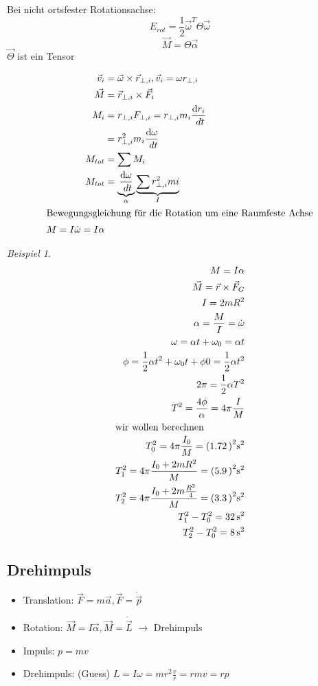 \documentclass[a4paper]{scrartcl}
\renewcommand{\d}{\mathrm{d}}
\renewcommand{\v}[1]{\vec{#1}}
\newcommand{\dd}[2]{\frac{\d #1}{\ d#2}}
\theoremstyle{definition}
\theoremstyle{plain}
\theoremstyle{plain}
\theoremstyle{remark}
\theoremstyle{remark}
\theoremstyle{remark}
\newtheorem{ex}{Beispiel}
\begin{document}
Bei nicht ortsfester Rotationsachse:
\[E_{rot} = \frac{1}{2} \v \omega^{T} \Theta \v \omega\]
\[\v M = \Theta \v \alpha\]
$\v \Theta$ ist ein Tensor

\begin{align*}
\v v_i &= \v \omega \times \v r_{\perp, i}, \v v_i = \omega r_{\perp,i} \\
\v M &= \v r_{\perp,i} \times \v F_i \\
M_i &= r_{\perp, i} F_{\perp, i} =  r_{\perp, i} m_i \dd{r_i}{t} \\
&= r_{\perp,i}^2 m_i \dd{\omega}{t} \\
M_{tot} &= \sum M_i \\
M_{tot} &= \underbrace{\dd{\omega}{t}}_{\alpha} \underbrace{\sum r_{\perp,i}^2 mi}_{I} \\
\intertext{Bewegungsgleichung für die Rotation um eine Raumfeste Achse}
M = I \dot{\omega} = I \alpha
\end{align*}

\begin{ex}
\begin{align*}
M = I \alpha \\
\v M = \v r \times \v F_G \\
I = 2m R^2 \\
\alpha = \frac{M}{I} = \dot{\omega} \\
\omega = \alpha t + \omega_0 = \alpha t \\
\phi = \frac{1}{2} \alpha t^2 + \omega_0 t + \phi 0 = \frac{1}{2} \alpha t^2 \\
2\pi = \frac{1}{2} \alpha T^2 \\
T^2 = \frac{4 \phi}{\alpha} = 4 \pi \frac{I}{M} \\
\intertext{wir wollen berechnen}
T_0^2 = 4\pi \frac{I_0}{M} = (\SI{1.72})^2 \si{\second\squared} \\
T_1^2 = 4\pi \frac{I_0 + 2 m R^2}{M} = (\SI{5.9})^2 \si{\second\squared} \\
T_2^2 = 4\pi \frac{I_0 + 2 m \frac{R^2}{4}}{M} = (\SI{3.3})^2 \si{\second\squared} \\
T_1^2 - T_0^2 = \SI{32}{\second\squared} \\
T_2^2 - T_0^2 = \SI{8}{\second\squared} \\
\end{align*}
\end{ex}
\subsection{Drehimpuls}
\label{sec-8-7}
\begin{itemize}
\item Translation: $\v F = m \v a, \v F = \dot{\v p}$
\item Rotation: $\v M = I \v \alpha, \v M = \dot{\v L}$ $\rightarrow$ Drehimpuls
\item Impuls: $p = mv$
\item Drehimpuls: (Guess) $L = I \omega = m r^2 \frac{v}{r} = r m v = r p$
\end{itemize}
\end{document}
